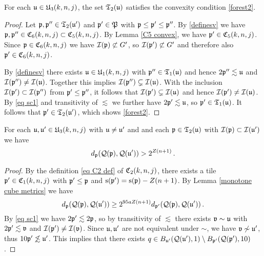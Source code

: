 {\begin{lemma}
    \label{forest convex}
    For each $\mathfrak u\in \mathfrak U_3(k,n,j)$,
    the set $\mathfrak{T}_2(\mathfrak u)$
    satisfies the convexity condition \eqref{forest2}.
\end{lemma}

\begin{proof}
    Let $\mathfrak p, \mathfrak p'' \in \mathfrak{T}_2(\mathfrak u')$ and $\mathfrak p' \in \mathfrak P$ with $\mathfrak p \le \mathfrak p' \le \mathfrak p''$. By \eqref{definesv} we have $\mathfrak p, \mathfrak p'' \in \mathfrak C_6(k,n,j) \subset \mathfrak C_5(k,n,j)$. By Lemma \ref{C5 convex}, we have $\mathfrak p' \in \mathfrak C_5(k,n,j)$. Since $\mathfrak p \in \mathfrak C_6(k,n,j)$ we have $\mathcal{I}(\mathfrak p) \not \subset G'$, so $\mathcal{I}(\mathfrak p') \not \subset G'$ and therefore also $\mathfrak p' \in \mathfrak C_6(k,n,j)$.

    By \eqref{definesv} there exists $\mathfrak u \in \mathfrak U_1(k,n,j)$ with $\mathfrak p'' \in \mathfrak{T}_1(\mathfrak u)$ and hence $2\mathfrak p'' \lesssim \mathfrak u$ and $\mathcal{I}(\mathfrak p'') \ne \mathcal{I}(\mathfrak u)$. Together this implies $\mathcal{I}(\mathfrak p'') \subsetneq \mathcal{I}(\mathfrak u)$. With the inclusion $\mathcal{I}(\mathfrak p') \subset \mathcal{I}(\mathfrak p'')$ from $\mathfrak p' \le \mathfrak p''$, it follows that $\mathcal{I}(\mathfrak p') \subsetneq \mathcal{I}(\mathfrak u)$ and hence $\mathcal{I}(\mathfrak p') \ne \mathcal{I}(\mathfrak u)$.
    By \eqref{eq sc1} and transitivity of $\lesssim$ we further have $2\mathfrak p' \lesssim \mathfrak u$, so $\mathfrak p' \in \mathfrak{T}_1(\mathfrak u)$.
    It follows that $\mathfrak p' \in \mathfrak{T}_2(\mathfrak u')$, which shows \eqref{forest2}.
\end{proof}

\begin{lemma}
    \label{forest separation}
    For each $\mathfrak u,\mathfrak u'\in \mathfrak U_3(k,n,j)$ with $\mathfrak u\neq \mathfrak u'$ and
    and each $\mathfrak p \in \mathfrak T_2(\mathfrak u)$
    with $\mathcal{I}(\mathfrak p)\subset \mathcal{I}(\mathfrak u')$ we have
    \begin{equation}
    d_{\mathfrak p}(\mathcal{Q}(\mathfrak p), \mathcal{Q}(\mathfrak u')) > 2^{Z(n+1)}\,.
    \end{equation}
\end{lemma}

\begin{proof}
    By the definition \eqref{eq C2 def} of $\mathfrak C_2(k,n,j)$, there exists a tile $\mathfrak p' \in \mathfrak C_1(k,n,j)$ with $\mathfrak p' \le \mathfrak p$ and $\mathrm{s}(\mathfrak p') = \mathrm{s}(\mathfrak p)- Z(n+1)$.
    By Lemma \ref{monotone cube metrics} we have
    $$
        d_{\mathfrak p}(\mathcal{Q}(\mathfrak p), \mathcal{Q}(\mathfrak u')) \ge 2^{95a Z(n+1)} d_{\mathfrak p'}(\mathcal{Q}(\mathfrak p), \mathcal{Q}(\mathfrak u'))\,.
    $$
    By \eqref{eq sc1} we have $2\mathfrak p' \lesssim 2\mathfrak p$, so by transitivity of $\lesssim$ there exists $\mathfrak{v} \sim \mathfrak u$ with $2\mathfrak p' \lesssim \mathfrak{v}$ and $\mathcal{I}(\mathfrak p') \ne \mathcal{I}(\mathfrak{v})$. Since $\mathfrak u, \mathfrak u'$ are not equivalent under $\sim$, we have $\mathfrak{v} \not \sim \mathfrak u'$, thus $10\mathfrak p' \not\lesssim \mathfrak u'$. This implies that there exists $q \in B_{\mathfrak u'}(\mathcal{Q}(\mathfrak u'), 1) \setminus B_{\mathfrak p'}(\mathcal{Q}(\mathfrak p'), 10)$.


\end{proof}}

